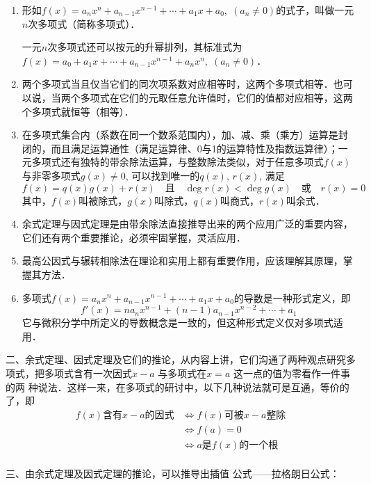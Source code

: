 \begin{enumerate}
    \item 形如$f (x) =a_nx^n+a_{n-1}x^{n-1}+\cdots+a_1x+a_0,\; (a_n\ne 0)$的式子，叫做一元$n$次多项式（简称多项式）．
    
一元$n$次多项式还可以按元的升幂排列，其标准式为$f (x) =a_0 +a_1x+\cdots +a_{n-1}x^{n-1}+a_nx^n,\;  (a_n\ne 0)$．


\item 两个多项式当且仅当它们的同次项系数对应相等时，这两个多项式相等．也可以说，当两个多项式在它们的元取任意允许值时，它们的值都对应相等，这两个多项式就恒等（相等）．
\item 在多项式集合内（系数在同一个数系范围内），加、减、乘（乘方）运算是封闭的，而且满足运算通性（满足运算律、0与1的运算特性及指数运算律）；一元多项式还有独特的带余除法运算，与整数除法类似，对于任意多项式$f(x)$与非零多项式$g(x)\ne 0$, 可以找到唯一的$q(x)$, $r(x)$, 满足
\[f(x)=q(x)g(x)+r(x) \quad \text{且}\quad  \deg r(x)<\deg g(x)\quad \text{或}\quad r (x) =0\]
其中，$f(x)$叫被除式，$g(x)$叫除式，$q(x)$叫商式，$r(x)$叫余式．

\item 余式定理与因式定理是由带余除法直接推导出来的两个应用广泛的重要内容，它们还有两个重要推论，必须牢固掌握，灵活应用．\item 最高公因式与辗转相除法在理论和实用上都有重要作用，应该理解其原理，掌握其方法．
\item 多项式$f(x)=a_nx^n+a_{n-1}x^{n-1}+\cdots+a_1x+a_0$的导数是一种形式定义，即
\[f' (x) =na_nx^{n-1}+ (n-1) a_{n-1}x^{n-2}+\cdots +a_1\]
它与微积分学中所定义的导数概念是一致的，但这种形式定义仅对多项式适用．
\end{enumerate}

二、余式定理、因式定理及它们的推论，从内容上讲，它们沟通了两种观点研究多项式，把多项式含有一次因式$x-a$ 与多项式在$x=a$ 这一点的值为零看作一件事的两
种说法．这样一来，在多项式的研讨中，以下几种说法就可是互通，等价的了，即
\[\begin{split}
    \text{$f(x)$含有$x-a$的因式} &\Longleftrightarrow \text{$f(x)$可被$x-a$整除}\\
    &\Longleftrightarrow f(a)=0\\
    &\Longleftrightarrow \text{$a$是$f(x)$的一个根}\\
\end{split}\]

三、由余式定理及因式定理的推论，可以推导出插值
公式——拉格朗日公式：

